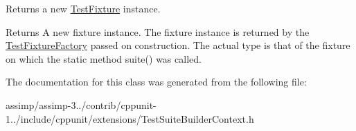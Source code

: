 Returns a new \hyperlink{class_test_fixture}{Test\+Fixture} instance. 

\begin{DoxyReturn}{Returns}
A new fixture instance. The fixture instance is returned by the \hyperlink{class_test_fixture_factory}{Test\+Fixture\+Factory} passed on construction. The actual type is that of the fixture on which the static method suite() was called. 
\end{DoxyReturn}


The documentation for this class was generated from the following file\+:\begin{DoxyCompactItemize}
\item 
assimp/assimp-\/3../contrib/cppunit-\/1../include/cppunit/extensions/Test\+Suite\+Builder\+Context.\+h\end{DoxyCompactItemize}
